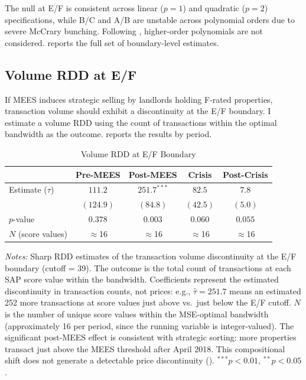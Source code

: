 \documentclass[12pt]{article}
\begin{document}
The null at E/F is consistent across linear ($p=1$) and quadratic ($p=2$) specifications, while B/C and A/B are unstable across polynomial orders due to severe McCrary bunching. Following \citet{gelman2019why}, higher-order polynomials are not considered.  reports the full set of boundary-level estimates.



\subsection{Volume RDD at E/F}\label{app:volume}

If MEES induces strategic selling by landlords holding F-rated properties, transaction volume should exhibit a discontinuity at the E/F boundary. I estimate a volume RDD using the count of transactions within the optimal bandwidth as the outcome.  reports the results by period.

\begin{table}[H]
\centering
\caption{Volume RDD at E/F Boundary}
\label{tab:volume_rdd}
\begin{tabular}{lcccc}
\toprule
 & Pre-MEES & Post-MEES & Crisis & Post-Crisis \\
\midrule
Estimate ($\tau$) & $111.2$ & $251.7^{***}$ & $82.5$ & $7.8$ \\
 & $(124.9)$ & $(84.8)$ & $(42.5)$ & $(5.0)$ \\
$p$-value & $0.378$ & $0.003$ & $0.060$ & $0.055$ \\
$N$ (score values) & $\approx$16 & $\approx$16 & $\approx$16 & $\approx$16 \\
\bottomrule
\end{tabular}
\begin{minipage}{\textwidth}
\footnotesize
\textit{Notes:} Sharp RDD estimates of the transaction volume discontinuity at the E/F boundary (cutoff = 39). The outcome is the total count of transactions at each SAP score value within the bandwidth. Coefficients represent the estimated discontinuity in transaction counts, not prices: e.g., $\hat{\tau} = 251.7$ means an estimated 252 more transactions at score values just above vs.\ just below the E/F cutoff. $N$ is the number of unique score values within the MSE-optimal bandwidth (approximately 16 per period, since the running variable is integer-valued). The significant post-MEES effect is consistent with strategic sorting: more properties transact just above the MEES threshold after April 2018. This compositional shift does not generate a detectable price discontinuity ().
$^{***}p<0.01$, $^{**}p<0.05$.
\end{minipage}
\end{table}
\end{document}
